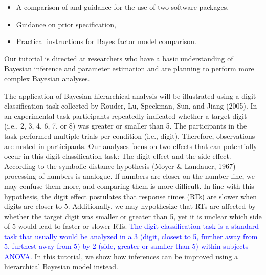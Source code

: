 \documentclass[
  english,
  doc,floatsintext]{apa6}
\providecommand{\tightlist}{%
  \setlength{\itemsep}{0pt}\setlength{\parskip}{0pt}}
\begin{document}
\begin{itemize}
\tightlist
\item
  A comparison of and guidance for the use of two software packages,
\item
  Guidance on prior specification,
\item
  Practical instructions for Bayes factor model comparison.
\end{itemize}

Our tutorial is directed at researchers who have a basic understanding of Bayesian inference and parameter estimation and are planning to perform more complex Bayesian analyses.

The application of Bayesian hierarchical analysis will be illustrated using a digit classification task collected by Rouder, Lu, Speckman, Sun, and Jiang (2005). In an experimental task participants repeatedly indicated whether a target digit (i.e., 2, 3, 4, 6, 7, or 8) was greater or smaller than 5. The participants in the task performed multiple trials per condition (i.e., digit). Therefore, observations are nested in participants. Our analyses focus on two effects that can potentially occur in this digit classification task: The digit effect and the side effect. According to the symbolic distance hypothesis (Moyer \& Landauer, 1967) processing of numbers is analogue. If numbers are closer on the number line, we may confuse them more, and comparing them is more difficult. In line with this hypothesis, the digit effect postulates that response times (RTs) are slower when digits are closer to 5. Additionally, we may hypothesize that RTs are affected by whether the target digit was smaller or greater than 5, yet it is unclear which side of 5 would lead to faster or slower RTs. \textcolor{blue}{The digit classification task is a standard task that usually would be analyzed in a 3 (digit, closest to 5, further away from 5, furthest away from 5) by 2 (side, greater or samller than 5) within-subjects ANOVA.} In this tutorial, we show how inferences can be improved using a hierarchical Bayesian model instead.
\end{document}
